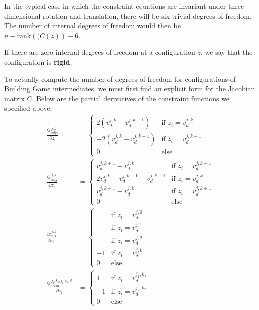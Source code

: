 In the typical case in which the constraint equations are invariant under three-dimensional rotation and translation, there will be six trivial degrees of freedom. The number of internal degrees of freedom would then be $n - \text{rank}\left((C(z)\right) - 6$.  

\begin{mydef}
If there are zero internal degrees of freedom at a configuration $z$, we say that the configuration is \textbf{rigid}.
\end{mydef}

To actually compute the number of degrees of freedom for configurations of Building Game intermediates, we must first find an explicit form for the Jacobian matrix $C$. Below are the partial derivatives of the constraint functions we specified above.  
\begin{align}
	\frac{\partial c_{edge}^{j,k}}{\partial z_i} &=
  	\begin{cases}
        	2\left(v^{j,k}_d-v^{j,k-1}_d\right) 	& \text{if } z_i = v^{j,k}_d \\
   		-2\left(v^{j,k}_d-v^{j,k-1}_d\right) 	& \text{if } z_i = v^{j,k-1}_d \\
   		0       				& \text{else} 
  	\end{cases} \\
	\frac{\partial c_{ang}^{j,k}}{\partial z_i} &=
  	\begin{cases}
        	v^{j,k+1}_d-v^{j,k}_d 			& \text{if } z_i = v^{j,k-1}_d \\
        	2v^{j,k}_d-v^{j,k-1}_d -v^{j,k+1}_d 	& \text{if } z_i = v^{j,k}_d \\
   		v^{j,k-1}_d-v^{j,k}_d 			& \text{if } z_i = v^{j,k+1}_d \\
   		0       				& \text{else} 
  	\end{cases} \\
	\frac{\partial c_{2D}^{j,k}}{\partial z_i} &=
  	\begin{cases}
        		& \text{if } z_i = v^{j,0}_d \\
        		& \text{if } z_i = v^{j,1}_d \\
        		& \text{if } z_i = v^{j,2}_d \\
          	-1 	& \text{if } z_i = v^{j,k}_d \\
   	  	0 	& \text{else} 
  	\end{cases} \\
	\frac{\partial c_{ident}^{j_1,k_1,j_2,k_2,d}}{\partial z_i} &=
  	\begin{cases}
        	1 	& \text{if } z_i = v^{j_1,k_1}_d \\
        	-1 	& \text{if } z_i = v^{j_2,k_2}_d \\
   		0       & \text{else} 
  	\end{cases} 
\end{align}

